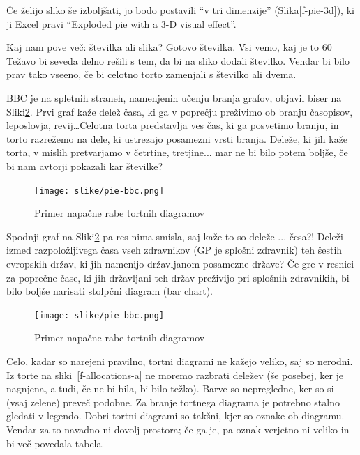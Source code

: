 Če želijo sliko še izboljšati, jo bodo postavili ``v tri dimenzije'' (Slika\ref{f-pie-3d}), ki ji Excel pravi ``Exploded pie with a 3-D visual effect''.

Kaj nam pove več: številka ali slika? Gotovo številka. Vsi vemo, kaj je to 60%
Težavo bi seveda delno rešili s tem, da bi na sliko dodali številko. Vendar bi bilo prav tako vseeno, če bi celotno torto zamenjali s številko ali dvema.

BBC je na spletnih straneh, namenjenih učenju branja grafov, objavil biser na Sliki\ref{f-pie-bbc}. Prvi graf kaže delež časa, ki ga v poprečju preživimo ob branju časopisov, leposlovja, revij\ldots Celotna torta predstavlja ves čas, ki ga posvetimo branju, in torto razrežemo na dele, ki ustrezajo posamezni vrsti branja. Deleže, ki jih kaže torta, v mislih pretvarjamo v četrtine, tretjine... mar ne bi bilo potem boljše, če bi nam avtorji pokazali kar številke?

\begin{figure}[htbp]
\begin{center}
\texttt{[image: slike/pie-bbc.png]}
\caption{Primer napačne rabe tortnih diagramov}
\label{f-pie-bbc}
\end{center}
\end{figure}

Spodnji graf na Sliki\ref{f-pie-bbc} pa res nima smisla, saj kaže to so deleže ... česa?! Deleži izmed
razpoložljivega časa vseh zdravnikov (GP je splošni zdravnik) teh šestih evropskih
držav, ki jih namenijo državljanom posamezne države? Če gre v resnici za
poprečne čase, ki jih državljani teh držav preživijo pri splošnih zdravnikih, bi bilo
boljše narisati stolpčni diagram (bar chart).

\begin{figure}[htbp]
\begin{center}
\texttt{[image: slike/pie-bbc.png]}
\caption{Primer napačne rabe tortnih diagramov}
\label{f-pie-bbc}
\end{center}
\end{figure}

Celo, kadar so narejeni pravilno, tortni diagrami ne kažejo veliko, saj so nerodni. Iz torte na sliki~\ref{f-allocations-a} ne moremo razbrati deležev (še posebej, ker je
nagnjena, a tudi, če ne bi bila, bi bilo težko). Barve so nepregledne, ker so si (vsaj
zelene) preveč podobne. Za branje tortnega diagrama je potrebno
stalno gledati v legendo. Dobri tortni diagrami so takšni, kjer so oznake ob
diagramu. Vendar za to navadno ni dovolj prostora; če ga je, pa oznak verjetno ni
veliko in bi več povedala tabela.

